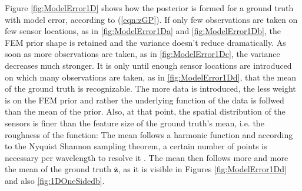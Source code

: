\documentclass[%
  a4paper,oneside,%
  11pt,%
  smallchapters,
  style=printdev,
  extramargin,
  green,%
  rgb, <cmyk>
  ]{tubsbook}
\begin{document}
Figure \ref{fig:ModelError1D} shows how the posterior is formed for a ground truth with model error, according to (\ref{eqn:zGP}). If only few observations are taken on few sensor locations, as in \ref{fig:ModelError1Da} and \ref{fig:ModelError1Db}, the FEM prior shape is retained and the variance doesn't reduce dramatically. As soon as more observations are taken, as in \ref{fig:ModelError1Dc}, the variance decreases much stronger. It is only until enough sensor locations are introduced on which many observations are taken, as in \ref{fig:ModelError1Dd}, that the mean of the ground truth is recognizable. The more data is introduced, the less weight is on the FEM prior and rather the underlying function of the data is follwed than the mean of the prior. Also, at that point, the spatial distribution of the sensors is finer than the feature size of the ground truth's mean, i.e. the roughness of the function: The mean follows a harmonic function and according to the Nyquist Shannon sampling theorem, a certain number of points is necessary per wavelength to resolve it \cite{Shannon1949,Marburga}. The mean then follows more and more the mean of the ground truth $\bar{\bm{z}}$, as it is visible in Figures \ref{fig:ModelError1Dd} and also \ref{fig:1DOneSidedb}. 
\end{document}
